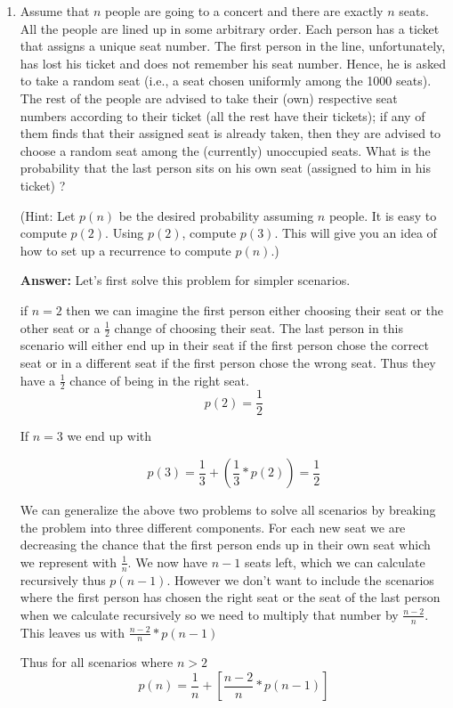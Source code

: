 \documentclass[11pt]{article}
\begin{document}
\begin{enumerate}
\item Assume that $n$ people are going to a concert and there are  exactly $n$ seats. 
All the people are lined up in some arbitrary order.  Each person has a ticket that assigns
a unique seat number.
The first person in the line, unfortunately, has lost his ticket and does not remember his seat number.
Hence, he is asked to take a random seat (i.e., a seat chosen uniformly
among the 1000 seats). The rest of the people are advised to take their (own) respective seat numbers according
to their ticket (all the rest have their tickets); if any of them finds that their assigned seat is already taken, then they are advised to choose a random seat among the (currently) unoccupied seats. What is the probability that the last person sits on his own seat (assigned to him in his ticket) ?

(Hint: Let $p(n)$ be the desired probability assuming $n$ people. It is easy to compute $p(2)$. Using $p(2)$, compute $p(3)$. This will give you an idea of how to  set up a recurrence to compute $p(n)$.)

\textbf{Answer:}
Let's first solve this problem for simpler scenarios.

if $n=2$ then we can imagine the first person either choosing their seat or the other seat or a $\frac{1}{2}$ change of choosing their seat. The last person in this scenario will either end up in their seat if the first person chose the correct seat or in a different seat if the first person chose the wrong seat. Thus they have a $\frac{1}{2}$ chance of being in the right seat.
\[
p(2) = \frac{1}{2}
\]

If $n=3$ we end up with

\[
p(3) = \frac{1}{3} + (\frac{1}{3} * p(2)) = \frac{1}{2}
\]

We can generalize the above two problems to solve all scenarios by breaking the problem into three different components. For each new seat we are decreasing the chance that the first person ends up in their own seat which we represent with $\frac{1}{n}$. We now have $n-1$ seats left, which we can calculate recursively thus $p(n-1)$. However we don't want to include the scenarios where the first person has chosen the right seat or the seat of the last person when we calculate recursively so we need to multiply that number by $\frac{n - 2}{n}$. This leaves us with $\frac{n-2}{n} *p(n-1)$

Thus for all scenarios where $n>2$
\[
p(n) = \frac{1}{n} + \left[\frac{n - 2}{n}*p(n-1)\right]
\]


\end{enumerate}
\end{document}
